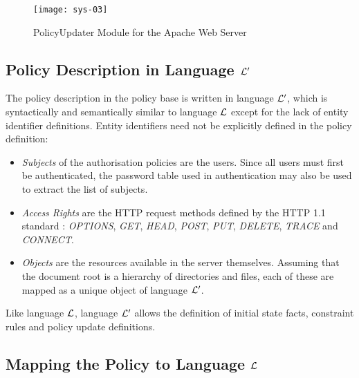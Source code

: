 \documentclass[11pt]{report}
\begin{document}
      \begin{figure}[tbhp]
        \begin{center}
          \texttt{[image: sys-03]}
          \caption{PolicyUpdater Module for the Apache Web Server}
          \label{figu-polup-modul}
        \end{center}
      \end{figure}

      \subsection{Policy Description in Language ${\cal L}'$}
        \label{subs-polup-polde}

        The policy description in the policy base is written in language
        ${\cal L'}$, which is syntactically and semantically similar to
        language ${\cal L}$ except for the lack of entity identifier
        definitions. Entity identifiers need not be explicitly defined in
        the policy definition:

        \begin{itemize}
          \item
            {\em Subjects} of the authorisation policies are the users. Since
            all users must first be authenticated, the password table used
            in authentication may also be used to extract the list of subjects.
          \item
            {\em Access Rights} are the HTTP request methods defined by the
            HTTP 1.1 standard \cite{HTTP1}: {\em OPTIONS}, {\em GET},
            {\em HEAD}, {\em POST}, {\em PUT}, {\em DELETE}, {\em TRACE} and
            {\em CONNECT}.
          \item
            {\em Objects} are the resources available in the server themselves.
            Assuming that the document root is a hierarchy of directories and
            files, each of these are mapped as a unique object of language
            ${\cal L'}$.
        \end{itemize}

        Like language ${\cal L}$, language ${\cal L'}$ allows the definition of
        initial state facts, constraint rules and policy update definitions.

      \subsection{Mapping the Policy to Language ${\cal L}$}
        \label{subs-polup-mappi}
\end{document}
